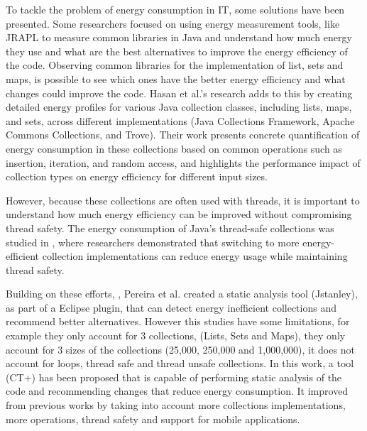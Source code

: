 \documentclass[sigplan]{acmart}
\begin{document}
To tackle the problem of energy consumption in IT, some solutions have been presented. Some researchers focused on using energy measurement tools, like JRAPL to measure common libraries in Java and understand how much energy they use and what are the best alternatives to improve the energy efficiency of the code\cite{10.1145/2896967.2896968}. Observing common libraries for the implementation of list, sets and maps, is possible to see which ones have the better energy efficiency and what changes could improve the code.
Hasan et al.'s \cite{10.1145/2884781.2884869} research adds to this by creating detailed energy profiles for various Java collection classes, including lists, maps, and sets, across different implementations (Java Collections Framework, Apache Commons Collections, and Trove). Their work presents concrete quantification of energy consumption in these collections based on common operations such as insertion, iteration, and random access, and highlights the performance impact of collection types on energy efficiency for different input sizes.

However, because these collections are often used with threads, it is important to understand how much energy efficiency can be improved without compromising thread safety. The energy consumption of Java's thread-safe collections was studied in \cite{7816451}, where researchers demonstrated that switching to more energy-efficient collection implementations can reduce energy usage while maintaining thread safety.

Building on these efforts, \cite{10.1145/3238147.3240473}, Pereira et al. created a static analysis tool (Jstanley), as part of a Eclipse plugin, that can detect energy inefficient collections and recommend better alternatives. However this studies have some limitations, for example they only account for 3 collections, (Lists, Sets and Maps), they only account for 3 sizes of the collections (25,000, 250,000 and 1,000,000), it does not account for loops, thread safe and thread unsafe collections. 
In this work\cite{8816747}, a tool (CT+) has been proposed that is capable of performing static analysis of the code and recommending changes that reduce energy consumption. It improved from previous works by taking into account more collections implementations, more operations, thread safety and support for mobile applications. 
\end{document}

